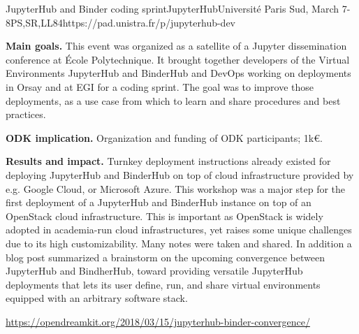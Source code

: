 \begin{event}{JupyterHub and Binder coding sprint}{JupyterHub}{Université Paris Sud, March 7-8}{PS,SR,LL}{8}{4}{https://pad.unistra.fr/p/jupyterhub-dev}

  \textbf{Main goals.} This event was organized as a satellite of a
  Jupyter dissemination conference at École Polytechnique. It brought
  together developers of the Virtual Environments JupyterHub and
  BinderHub and DevOps working on deployments in Orsay and at EGI for
  a coding sprint. The goal was to improve those deployments, as a use
  case from which to learn and share procedures and best practices.

  \textbf{ODK implication.} Organization and funding of ODK participants; \approx 1k€.

  \textbf{Results and impact.} Turnkey deployment instructions already
  existed for deploying JupyterHub and BinderHub on top of cloud
  infrastructure provided by e.g. Google Cloud, or Microsoft Azure.
  This workshop was a major step for the first deployment of a
  JupyterHub and BinderHub instance on top of an OpenStack cloud
  infrastructure. This is important as OpenStack is widely adopted in
  academia-run cloud infrastructures, yet raises some unique
  challenges due to its high customizability. Many notes were taken
  and shared. In addition a blog post summarized a brainstorm on the
  upcoming convergence between JupyterHub and BindherHub, toward
  providing versatile JupyterHub deployments that lets its user
  define, run, and share virtual environments equipped with an
  arbitrary software stack.

  \url{https://opendreamkit.org/2018/03/15/jupyterhub-binder-convergence/}
\end{event}
